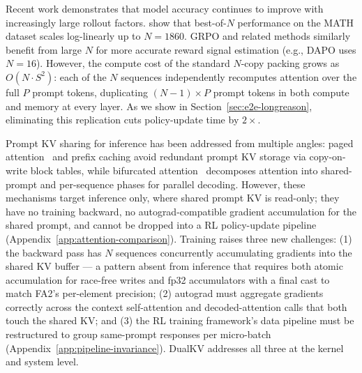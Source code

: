\documentclass{article}
\begin{document}
Recent work demonstrates that model accuracy continues to improve with increasingly large rollout factors. \citet{lightman2023lets} show that best-of-$N$ performance on the MATH dataset scales log-linearly up to $N{=}1860$. GRPO and related methods similarly benefit from large $N$ for more accurate reward signal estimation (e.g., DAPO uses $N{=}16$). However, the compute cost of the standard $N$-copy packing grows as $O(N \cdot S^2)$: each of the $N$ sequences independently recomputes attention over the full $P$ prompt tokens, duplicating $(N{-}1) \times P$ prompt tokens in both compute and memory at every layer. As we show in Section~\ref{sec:e2e-longreason}, eliminating this replication cuts policy-update time by $2\times$.

Prompt KV sharing for inference has been addressed from multiple angles: paged attention~\citep{kwon2023vllm} and prefix caching avoid redundant prompt KV storage via copy-on-write block tables, while bifurcated attention~\citep{athiwaratkun2024bifurcated} decomposes attention into shared-prompt and per-sequence phases for parallel decoding. However, these mechanisms target inference only, where shared prompt KV is read-only; they have no training backward, no autograd-compatible gradient accumulation for the shared prompt, and cannot be dropped into a RL policy-update pipeline (Appendix~\ref{app:attention-comparison}). Training raises three new challenges: (1) the backward pass has $N$ sequences concurrently accumulating gradients into the shared KV buffer --- a pattern absent from inference that requires both atomic accumulation for race-free writes and fp32 accumulators with a final cast to match FA2's per-element precision; (2) autograd must aggregate gradients correctly across the context self-attention and decoded-attention calls that both touch the shared KV; and (3) the RL training framework's data pipeline must be restructured to group same-prompt responses per micro-batch (Appendix~\ref{app:pipeline-invariance}). DualKV addresses all three at the kernel and system level.
\end{document}
